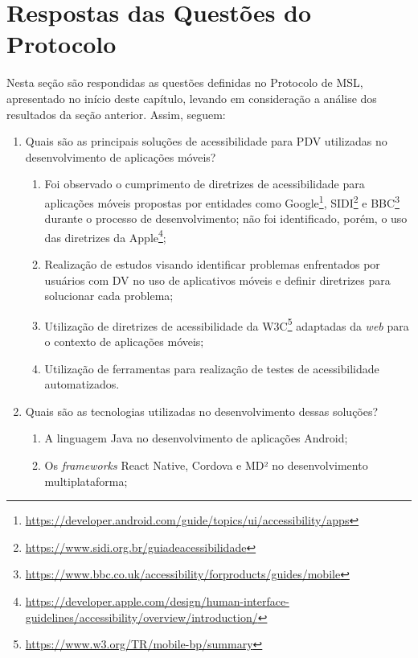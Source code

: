 \section{Respostas das Questões do Protocolo}

Nesta seção são respondidas as questões definidas no Protocolo de MSL, apresentado no início deste capítulo, levando em consideração a análise dos resultados da seção anterior.
Assim, seguem:

\begin{enumerate}
      \item Quais são as principais soluções de acessibilidade para PDV utilizadas
            no desenvolvimento de aplicações móveis?
            \begin{enumerate}
                  \item Foi observado o cumprimento de diretrizes de acessibilidade para aplicações móveis propostas por entidades
                        como Google\footnote{\url{https://developer.android.com/guide/topics/ui/accessibility/apps}},
                        SIDI\footnote{\url{https://www.sidi.org.br/guiadeacessibilidade}} e
                        BBC\footnote{\url{https://www.bbc.co.uk/accessibility/forproducts/guides/mobile}}
                        durante o processo de desenvolvimento; não foi identificado, porém, o uso das diretrizes da
                        Apple\footnote{\url{https://developer.apple.com/design/human-interface-guidelines/accessibility/overview/introduction/}};
                  \item Realização de estudos visando identificar problemas enfrentados por usuários com DV no uso de aplicativos móveis e definir diretrizes para solucionar cada problema;
                  \item Utilização de diretrizes de acessibilidade da W3C\footnote{\url{https://www.w3.org/TR/mobile-bp/summary}} adaptadas da \emph{web} para o contexto de aplicações móveis;
                  \item Utilização de ferramentas para realização de testes de acessibilidade automatizados.
            \end{enumerate}
      \item Quais são as tecnologias utilizadas no desenvolvimento dessas soluções?
            \begin{enumerate}
                  \item A linguagem Java no desenvolvimento de aplicações Android;
                  \item Os \emph{frameworks} React Native, Cordova e MD² no desenvolvimento multiplataforma;

\end{enumerate}
\end{enumerate}
